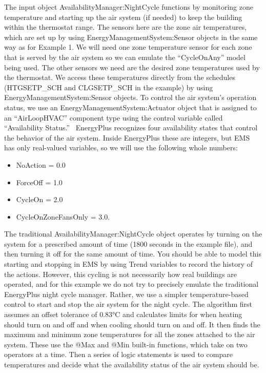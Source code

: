 The input object AvailabilityManager:NightCycle functions by monitoring zone temperature and starting up the air system (if needed) to keep the building within the thermostat range. The sensors here are the zone air temperatures, which are set up by using EnergyManagementSystem:Sensor objects in the same way as for Example 1. We will need one zone temperature sensor for each zone that is served by the air system so we can emulate the ``CycleOnAny'' model being used. The other sensors we need are the desired zone temperatures used by the thermostat. We access these temperatures directly from the schedules (HTGSETP\_SCH and CLGSETP\_SCH in the example) by using EnergyManagementSystem:Sensor objects. To control the air system's operation status, we use an EnergyManagementSystem:Actuator object that is assigned to an ``AirLoopHVAC'' component type using the control variable called ``Availability Status.''~ EnergyPlus recognizes four availability states that control the behavior of the air system. Inside EnergyPlus these are integers, but EMS has only real-valued variables, so we will use the following whole numbers:

\begin{itemize}
\item
  NoAction = 0.0
\item
  ForceOff = 1.0
\item
  CycleOn = 2.0
\item
  CycleOnZoneFansOnly = 3.0.
\end{itemize}

The traditional AvailabilityManager:NightCycle object operates by turning on the system for a prescribed amount of time (1800 seconds in the example file), and then turning it off for the same amount of time. You should be able to model this starting and stopping in EMS by using Trend variables to record the history of the actions. However, this cycling is not necessarily how real buildings are operated, and for this example we do not try to precisely emulate the traditional EnergyPlus night cycle manager. Rather, we use a simpler temperature-based control to start and stop the air system for the night cycle. The algorithm first assumes an offset tolerance of 0.83°C and calculates limits for when heating should turn on and off and when cooling should turn on and off. It then finds the maximum and minimum zone temperatures for all the zones attached to the air system. These use the @Max and @Min built-in functions, which take on two operators at a time. Then a series of logic statements is used to compare temperatures and decide what the availability status of the air system should be.

